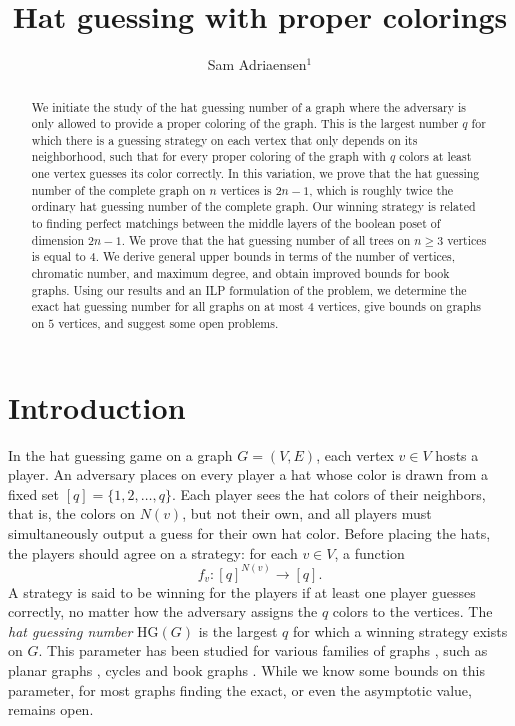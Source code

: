 \documentclass[a4paper,11pt]{amsproc}
\title{Hat guessing with proper colorings}
\author
[Adriaensen et al.]
{Sam Adriaensen$^1$}
\author
{Peter Bentley$^2$}
\author
{Anurag Bishnoi$^3$}
\author
{Wouter Cames van Batenburg$^4$}
\author
{Michael Kreiger$^5$}
\author
{Lars van der Kuil$^6$}
\author
{Saptarshi Mandal$^7$}
\author
{Anurag Ramachandran$^8$}
\author
{James Tuite$^{9,10}$}
\theoremstyle{plain}
\theoremstyle{definition}
\newcommand{\HG}{{\mathrm{HG}}}
\begin{document}
\begin{abstract}
We initiate the study of the hat guessing number of a graph where the adversary is only allowed to provide a proper coloring of the graph. 
This is the largest number $q$ for which there is a guessing strategy on each vertex that only depends on its neighborhood, such that for every proper coloring of the graph with $q$ colors at least one vertex guesses its color correctly.
In this variation, we prove that the hat guessing number of the complete graph on $n$ vertices is $2n - 1$, which is roughly twice the ordinary hat guessing number of the complete graph. 
Our winning strategy is related to finding perfect matchings between the middle layers of the boolean poset of dimension $2n - 1$.
We prove that the hat guessing number of all trees on $n \geq 3$ vertices is equal to $4$. 
We derive general upper bounds in terms of the number of vertices, chromatic number, and maximum degree, and obtain improved bounds for book graphs.
Using our results and an ILP formulation of the problem, we determine the exact hat guessing number for all graphs on at most $4$ vertices, give bounds on graphs on $5$ vertices, and suggest some open problems.
 \end{abstract}

\maketitle

\section{Introduction}


In the hat guessing game \cite{Winkler2001} on a graph $G=(V,E)$, each vertex $v\in V$ hosts a player. 
An adversary places on every player a hat whose color is drawn from a fixed set $[q]=\{1,2,\dots,q\}$. 
Each player sees the hat colors of their neighbors, that is, the colors on $N(v)$, but not their own, and all players must simultaneously output a guess for their own hat color. Before placing the hats, the players should agree on a strategy: for each $v\in V$, a function 
\[
f_v : [q]^{N(v)} \to [q].
\]
A strategy is said to be winning for the players if at least one player guesses correctly, no matter how the adversary assigns the $q$ colors to the vertices. The \emph{hat guessing number} $\HG(G)$ is the largest $q$ for which a winning strategy exists on $G$. 
This parameter has been studied for various families of graphs \cite{Alon2020}, such as planar graphs \cite{Bradshaw2022, latyshev2023}, cycles \cite{Szczechla2017} and book graphs \cite{He2022}. 
While we know some bounds on this parameter, for most graphs finding the exact, or even the asymptotic value, remains open. 
\newline
\end{document}
